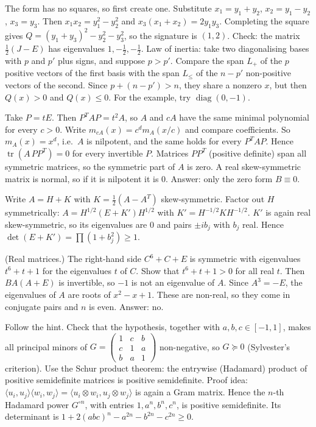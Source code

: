 \documentclass[11pt,a4paper]{article}
\begin{document}

The form has no squares, so first create one. Substitute \(x_1=y_1+y_2\), \(x_2=y_1-y_2\), \(x_3=y_3\). Then \(x_1x_2=y_1^2-y_2^2\) and \(x_3(x_1+x_2)=2y_1y_3\).
Completing the square gives \(Q=(y_1+y_3)^2-y_2^2-y_3^2\), so the signature is \((1,2)\). Check: the matrix \(\frac12(J-E)\) has eigenvalues \(1,-\frac12,-\frac12\).
Law of inertia: take two diagonalising bases with \(p\) and \(p'\) plus signs, and suppose \(p>p'\). Compare the span \(L_+\) of the \(p\) positive vectors of the first basis with the span \(L_{\le}\) of the \(n-p'\) non-positive vectors of the second. Since \(p+(n-p')>n\), they share a nonzero \(x\), but then \(Q(x)>0\) and \(Q(x)\le0\). For the example, try \(\operatorname{diag}(0,-1)\).

Take \(P=tE\). Then \(P^TAP=t^2A\), so \(A\) and \(cA\) have the same minimal polynomial for every \(c>0\). Write \(m_{cA}(x)=c^dm_A(x/c)\) and compare coefficients.
So \(m_A(x)=x^d\), i.e.\ \(A\) is nilpotent, and the same holds for every \(P^TAP\). Hence \(\operatorname{tr}(A\,PP^T)=0\) for every invertible \(P\). Matrices \(PP^T\) (positive definite) span all symmetric matrices, so the symmetric part of \(A\) is zero.
A real skew-symmetric matrix is normal, so if it is nilpotent it is \(0\). Answer: only the zero form \(B\equiv0\).

Write \(A=H+K\) with \(K=\frac12(A-A^T)\) skew-symmetric. Factor out \(H\) symmetrically: \(A=H^{1/2}(E+K')H^{1/2}\) with \(K'=H^{-1/2}KH^{-1/2}\).
\(K'\) is again real skew-symmetric, so its eigenvalues are \(0\) and pairs \(\pm ib_j\) with \(b_j\) real. Hence \(\det(E+K')=\prod(1+b_j^2)\ge1\).

(Real matrices.) The right-hand side \(C^6+C+E\) is symmetric with eigenvalues \(t^6+t+1\) for the eigenvalues \(t\) of \(C\). Show that \(t^6+t+1>0\) for all real \(t\).
Then \(BA(A+E)\) is invertible, so \(-1\) is not an eigenvalue of \(A\). Since \(A^3=-E\), the eigenvalues of \(A\) are roots of \(x^2-x+1\). These are non-real, so they come in conjugate pairs and \(n\) is even. Answer: no.

Follow the hint. Check that the hypothesis, together with \(a,b,c\in[-1,1]\), makes all principal minors of
\(G=\begin{pmatrix}1&c&b\\c&1&a\\b&a&1\end{pmatrix}\) non-negative, so \(G\succeq0\) (Sylvester's criterion).
Use the Schur product theorem: the entrywise (Hadamard) product of positive semidefinite matrices is positive semidefinite. Proof idea: \(\langle u_i,u_j\rangle\langle w_i,w_j\rangle=\langle u_i\otimes w_i,u_j\otimes w_j\rangle\) is again a Gram matrix.
Hence the \(n\)-th Hadamard power \(G^{\circ n}\), with entries \(1,a^n,b^n,c^n\), is positive semidefinite. Its determinant is \(1+2(abc)^n-a^{2n}-b^{2n}-c^{2n}\ge0\).
\end{document}

